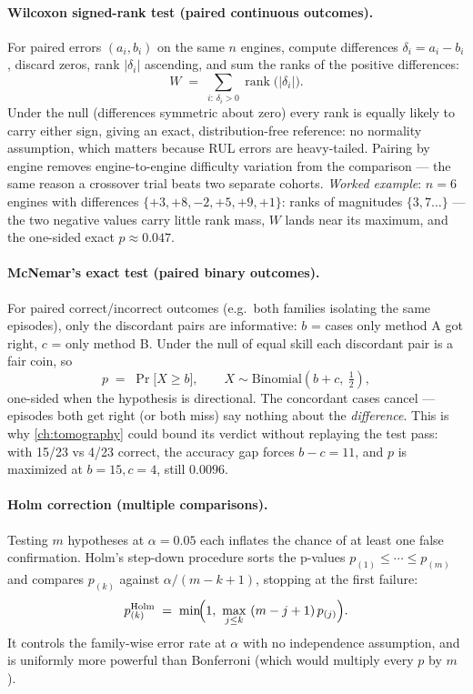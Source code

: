 \paragraph{Wilcoxon signed-rank test (paired continuous outcomes).} For paired errors
$(a_i, b_i)$ on the same $n$ engines, compute differences $\delta_i = a_i - b_i$, discard
zeros, rank $|\delta_i|$ ascending, and sum the ranks of the positive differences:
\begin{equation}
  W \;=\; \sum_{i:\,\delta_i > 0} \operatorname{rank}\bigl(|\delta_i|\bigr).
  \label{eq:wilcoxon}
\end{equation}
Under the null (differences symmetric about zero) every rank is equally likely to carry
either sign, giving an exact, distribution-free reference: no normality assumption, which
matters because RUL errors are heavy-tailed. Pairing by engine removes engine-to-engine
difficulty variation from the comparison --- the same reason a crossover trial beats two
separate cohorts. \emph{Worked example}: $n=6$ engines with differences
$\{+3, +8, -2, +5, +9, +1\}$: ranks of magnitudes $\{3,7\ldots\}$ --- the two negative
values carry little rank mass, $W$ lands near its maximum, and the one-sided exact
$p \approx 0.047$.

\paragraph{McNemar's exact test (paired binary outcomes).} For paired correct/incorrect
outcomes (e.g.\ both families isolating the same episodes), only the discordant pairs are
informative: $b$ = cases only method A got right, $c$ = only method B. Under the null of
equal skill each discordant pair is a fair coin, so
\begin{equation}
  p \;=\; \Pr\bigl[X \ge b\bigr], \qquad X \sim \mathrm{Binomial}(b+c,\ \tfrac12),
  \label{eq:mcnemar}
\end{equation}
one-sided when the hypothesis is directional. The concordant cases cancel --- episodes both
get right (or both miss) say nothing about the \emph{difference}. This is why \cref{ch:tomography}
could bound its verdict without replaying the test pass: with 15/23 vs 4/23 correct, the
accuracy gap forces $b - c = 11$, and $p$ is maximized at $b=15, c=4$, still $0.0096$.

\paragraph{Holm correction (multiple comparisons).} Testing $m$ hypotheses at
$\alpha = 0.05$ each inflates the chance of at least one false confirmation. Holm's
step-down procedure sorts the p-values $p_{(1)} \le \cdots \le p_{(m)}$ and compares
$p_{(k)}$ against $\alpha / (m - k + 1)$, stopping at the first failure:
\begin{equation}
  p^{\text{Holm}}_{(k)} \;=\; \min\!\Bigl(1,\ \max_{j \le k}\ (m - j + 1)\, p_{(j)}\Bigr).
  \label{eq:holm}
\end{equation}
It controls the family-wise error rate at $\alpha$ with no independence assumption, and is
uniformly more powerful than Bonferroni (which would multiply every $p$ by $m$).

